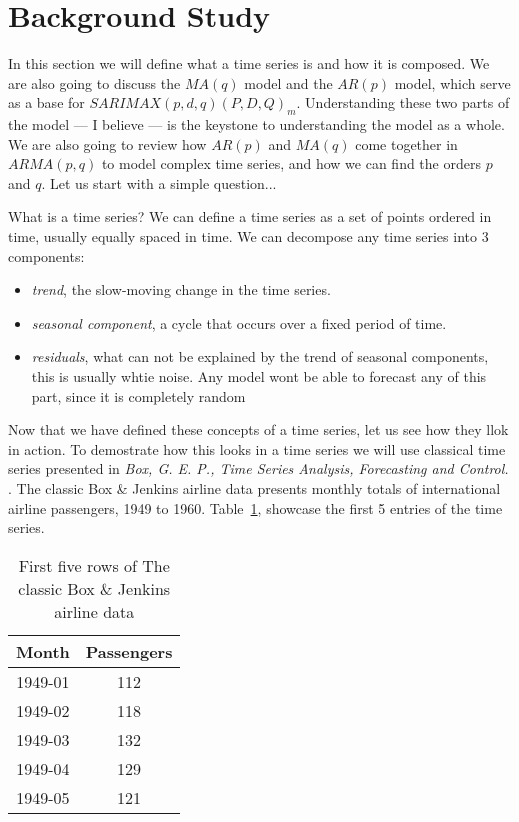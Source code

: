 \documentclass[journal]{IEEEtran}
\begin{document}
\section{Background Study}
In this section we will define what a time series is and how it is composed.
We are also going to discuss the $MA(q)$ model and the $AR(p)$ model, which
serve as a base for $SARIMAX(p,d,q)(P,D,Q)_m$. Understanding these two parts
of the model --- I believe --- is the keystone to understanding the model as a
whole. We are also going to review how $AR(p)$ and $MA(q)$ come together in
$ARMA(p,q)$ to model complex time series, and how we can find the orders $p$
and $q$. Let us start with a simple question...

What is a time series? We can define a time series as a set of points ordered
in time, usually equally spaced in time. \cite{timeseries} We can decompose
any time series into 3 components:

\begin{itemize}
    \item \emph{trend}, the slow-moving change in the time series.

    \item \emph{seasonal component}, a cycle that occurs over a fixed period
        of time.

    \item \emph{residuals}, what can not be explained by the trend of seasonal
        components, this is usually whtie noise. Any model wont be able to
        forecast any of this part, since it is completely random
\end{itemize}

Now that we have defined these concepts of a time series, let us see how they
llok in action. To demostrate how this looks in a time series we will use
classical time series presented in \emph{Box, G. E. P., Time Series Analysis,
Forecasting and Control.} \cite{airline}. The classic Box \& Jenkins airline
data presents monthly totals of international airline passengers, 1949 to
1960. Table~\ref{tab:passengerdata}, showcase the first 5 entries of the time
series.

\begin{table}[htbp]
  \centering
  \caption{First five rows of The classic Box \& Jenkins airline data}
  \label{tab:passengerdata}
  \begin{tabular}{|c|c|}
    \hline
    Month    & Passengers \\
    \hline
    1949-01  & 112        \\
    1949-02  & 118        \\
    1949-03  & 132        \\
    1949-04  & 129        \\
    1949-05  & 121        \\
    \hline
  \end{tabular}
\end{table}
\end{document}
